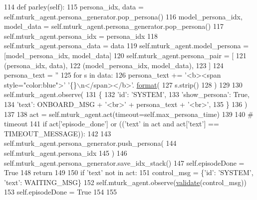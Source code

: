 \begin{DoxyCode}
114     \textcolor{keyword}{def }parley(self):
115         persona\_idx, data = self.mturk\_agent.persona\_generator.pop\_persona()
116         model\_persona\_idx, model\_data = self.mturk\_agent.persona\_generator.pop\_persona()
117         self.mturk\_agent.persona\_idx = persona\_idx
118         self.mturk\_agent.persona\_data = data
119         self.mturk\_agent.model\_persona = [model\_persona\_idx, model\_data]
120         self.mturk\_agent.persona\_pair = [
121             (persona\_idx, data),
122             (model\_persona\_idx, model\_data),
123         ]
124         persona\_text = \textcolor{stringliteral}{''}
125         \textcolor{keywordflow}{for} s \textcolor{keywordflow}{in} data:
126             persona\_text += \textcolor{stringliteral}{'<b><span style="color:blue">'} \textcolor{stringliteral}{'\{\}\(\backslash\)n</span></b>'}.
      \hyperlink{namespaceparlai_1_1chat__service_1_1services_1_1messenger_1_1shared__utils_a32e2e2022b824fbaf80c747160b52a76}{format}(
127                 s.strip()
128             )
129 
130         self.mturk\_agent.observe(
131             \{
132                 \textcolor{stringliteral}{'id'}: \textcolor{stringliteral}{'SYSTEM'},
133                 \textcolor{stringliteral}{'show\_persona'}: \textcolor{keyword}{True},
134                 \textcolor{stringliteral}{'text'}: ONBOARD\_MSG + \textcolor{stringliteral}{'<br>'} + persona\_text + \textcolor{stringliteral}{'<br>'},
135             \}
136         )
137 
138         act = self.mturk\_agent.act(timeout=self.max\_persona\_time)
139 
140         \textcolor{comment}{# timeout}
141         \textcolor{keywordflow}{if} act[\textcolor{stringliteral}{'episode\_done'}] \textcolor{keywordflow}{or} ((\textcolor{stringliteral}{'text'} \textcolor{keywordflow}{in} act \textcolor{keywordflow}{and} act[\textcolor{stringliteral}{'text'}] == TIMEOUT\_MESSAGE)):
142 
143             self.mturk\_agent.persona\_generator.push\_persona(
144                 self.mturk\_agent.persona\_idx
145             )
146             self.mturk\_agent.persona\_generator.save\_idx\_stack()
147             self.episodeDone = \textcolor{keyword}{True}
148             \textcolor{keywordflow}{return}
149 
150         \textcolor{keywordflow}{if} \textcolor{stringliteral}{'text'} \textcolor{keywordflow}{not} \textcolor{keywordflow}{in} act:
151             control\_msg = \{\textcolor{stringliteral}{'id'}: \textcolor{stringliteral}{'SYSTEM'}, \textcolor{stringliteral}{'text'}: WAITING\_MSG\}
152             self.mturk\_agent.observe(\hyperlink{namespaceparlai_1_1core_1_1worlds_afc3fad603b7bce41dbdc9cdc04a9c794}{validate}(control\_msg))
153             self.episodeDone = \textcolor{keyword}{True}
154 
155 
\end{DoxyCode}



